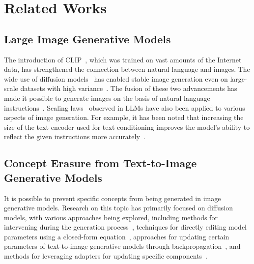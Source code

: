 \section{Related Works}
\subsection{Large Image Generative Models}
The introduction of CLIP~\cite{pmlr-v139-radford21a}, which was trained on vast amounts of the Internet data, has strengthened the connection between natural language and images. The wide use of diffusion models~\cite{pmlr-v37-sohl-dickstein15,NEURIPS2020_4c5bcfec} has enabled stable image generation even on large-scale datasets with high variance~\cite{dhariwal2021diffusion}. The fusion of these two advancements has made it possible to generate images on the basis of natural language instructions~\cite{pmlr-v162-nichol22a,saharia2022photorealistic}. Scaling laws~\cite{kaplan2020scalinglawsneurallanguage,hoffmann2022an} observed in LLMs have also been applied to various aspects of image generation. For example, it has been noted that increasing the size of the text encoder used for text conditioning improves the model's ability to reflect the given instructions more accurately~\cite{saharia2022photorealistic}.

\subsection{Concept Erasure from Text-to-Image Generative Models}
It is possible to prevent specific concepts from being generated in image generative models. Research on this topic has primarily focused on diffusion models, with various approaches being explored, including methods for intervening during the generation process~\cite{brack2023sega}, techniques for directly editing model parameters using a closed-form equation~\cite{Gandikota_2024_WACV,basu2024localizing,pmlr-v235-basu24b,Lu_2024_CVPR}, approaches for updating certain parameters of text-to-image generative models through backpropagation~\cite{Gandikota_2023_ICCV,Kumari_2023_ICCV,Fuchi_2024_BMVC,fan2024salun,kim2023safeselfdistillationinternetscaletexttoimage}, and methods for leveraging adapters for updating specific components~\cite{Lyu_2024_CVPR,Lu_2024_CVPR}.

